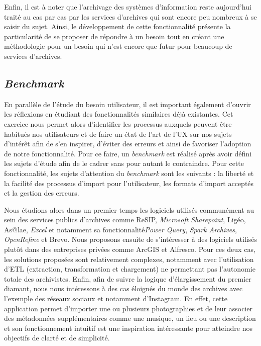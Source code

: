 Enfin, il est à noter que l’archivage des systèmes d'information reste aujourd’hui traité au cas par cas par les services d’archives qui sont encore peu nombreux à se saisir du sujet. Ainsi, le développement de cette fonctionnalité présente la particularité de se proposer de répondre à un besoin tout en créant une méthodologie pour un besoin qui n’est encore que futur pour beaucoup de services d’archives. 

\subsection{\textit{Benchmark}}

En parallèle de l’étude du besoin utilisateur, il est important également d’ouvrir les réflexions en étudiant des fonctionnalités similaires déjà existantes. Cet exercice nous permet alors d’identifier les processus auxquels peuvent être habitués nos utilisateurs et de faire un état de l’art de l’\gls{UX} sur nos sujets d’intérêt afin de s’en inspirer, d’éviter des erreurs et ainsi de favoriser l’adoption de notre fonctionnalité. Pour ce faire, un \textit{\gls{benchmark}} est réalisé après avoir défini les sujets d’étude afin de le cadrer sans pour autant le contraindre. Pour cette fonctionnalité, les sujets d’attention du \textit{\gls{benchmark}} sont les suivants : la liberté et la facilité des processus d’import pour l’utilisateur, les formats d’import acceptés et la gestion des erreurs.


Nous étudions alors dans un premier temps les logiciels utilisés communément au sein des services publics d’archives comme ReSIP, \textit{Microsoft Sharepoint}, Ligéo, As@lae, \textit{Excel} et notamment sa fonctionnalité\textit{Power Query}, \textit{Spark Archives}, \textit{OpenRefine} et Brevo. Nous  proposons ensuite de s’intéresser à des logiciels utilisés plutôt dans des entreprises privées comme ArcGIS et Alfresco. Pour ces deux cas, les solutions proposées sont relativement complexes, notamment avec l’utilisation d’\gls{ETL} (extraction, transformation et chargement) ne permettant pas l’autonomie totale des archivistes. Enfin, afin de suivre la logique d’élargissement du premier diamant, nous nous intéressons à des cas éloignés du monde des archives avec l’exemple des réseaux sociaux et notamment d’Instagram. En effet, cette application permet d’importer une ou plusieurs photographies et de leur associer des métadonnées supplémentaires comme une musique, un lieu ou une description et son fonctionnement intuitif est une inspiration intéressante pour atteindre nos objectifs de clarté et de simplicité. 


